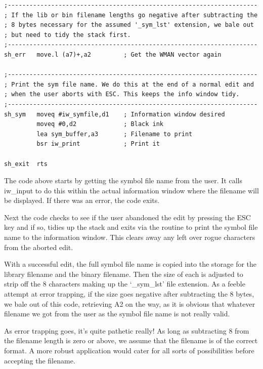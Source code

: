 \begin{lstlisting}[firstnumber=last,caption={LibGen\_asm - SymFile Action Code}]
;---------------------------------------------------------------------
; If the lib or bin filename lengths go negative after subtracting the
; 8 bytes necessary for the assumed '_sym_lst' extension, we bale out
; but need to tidy the stack first.
;---------------------------------------------------------------------
sh_err   move.l (a7)+,a2         ; Get the WMAN vector again

;---------------------------------------------------------------------
; Print the sym file name. We do this at the end of a normal edit and
; when the user aborts with ESC. This keeps the info window tidy.
;---------------------------------------------------------------------
sh_sym   moveq #iw_symfile,d1    ; Information window desired
         moveq #0,d2             ; Black ink
         lea sym_buffer,a3       ; Filename to print
         bsr iw_print            ; Print it

sh_exit  rts
\end{lstlisting}

The code above starts by getting the symbol file name from the user.
    It calls iw\_input to do this within the actual
    information window where the filename will be displayed. If there was an
    error, the code exits.

Next the code checks to see if the user abandoned the edit by
    pressing the ESC key and if so, tidies up the stack and exits via the
    routine to print the symbol file name to the information window. This
    clears away any left over rogue characters from the aborted edit.

With a successful edit, the full symbol file name is copied into the
    storage for the library filename and the binary filename. Then the size of
    each is adjusted to strip off the 8 characters making up the `\_sym\_lst'
    file extension. As a feeble attempt at error trapping, if the size goes
    negative after subtracting the 8 bytes, we bale out of this code,
    retrieving A2 on the way, as it is obvious that whatever filename we got
    from the user as the symbol file name is not really valid.

\begin{note}
As error trapping goes, it's quite pathetic really! As long as
      subtracting 8 from the filename length is zero or above, we assume that
      the filename is of the correct format. A more robust application would
      cater for all sorts of possibilities before accepting the
      filename.
\end{note}

